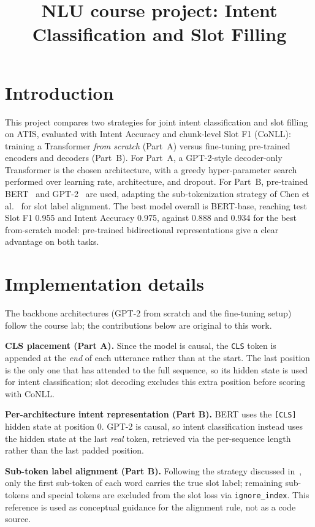 \documentclass[a4paper]{article}
\title{NLU course project: Intent Classification and Slot Filling}
\begin{document}
\maketitle

\section{Introduction}
This project compares two strategies for joint intent classification and
slot filling on ATIS, evaluated with Intent Accuracy and chunk-level Slot F1
(CoNLL): training a Transformer \emph{from scratch} (Part~A) versus
fine-tuning pre-trained encoders and decoders (Part~B). For Part~A, a
GPT-2-style decoder-only Transformer is the chosen architecture, with a
greedy hyper-parameter search performed over learning rate, architecture,
and dropout. For Part~B, pre-trained BERT~\cite{devlin2019} and
GPT-2~\cite{radford2019} are used, adapting the sub-tokenization strategy of
Chen et al.~\cite{chen2019} for slot label alignment. The best model overall
is BERT-base, reaching test Slot F1 0.955 and Intent Accuracy 0.975, against
0.888 and 0.934 for the best from-scratch model: pre-trained bidirectional
representations give a clear advantage on both tasks.

\section{Implementation details}
The backbone architectures (GPT-2 from scratch and the fine-tuning setup)
follow the course lab; the contributions below are original to this work.

\textbf{CLS placement (Part A).} Since the model is causal, the \texttt{CLS}
token is appended at the \emph{end} of each utterance rather than at the
start. The last position is the only one that has attended to the full
sequence, so its hidden state is used for intent classification; slot
decoding excludes this extra position before scoring with CoNLL.

\textbf{Per-architecture intent representation (Part B).} BERT uses the
\texttt{[CLS]} hidden state at position 0. GPT-2 is causal, so intent
classification instead uses the hidden state at the last \emph{real} token,
retrieved via the per-sequence length rather than the last padded position.

\textbf{Sub-token label alignment (Part B).} Following the strategy
discussed in~\cite{chen2019}, only the first sub-token of each word carries
the true slot label; remaining sub-tokens and special tokens are excluded
from the slot loss via \texttt{ignore\_index}. This reference is used as
conceptual guidance for the alignment rule, not as a code source.
\end{document}
